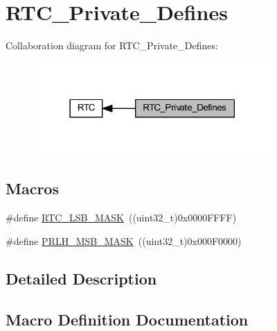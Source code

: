 \hypertarget{group___r_t_c___private___defines}{}\section{R\+T\+C\+\_\+\+Private\+\_\+\+Defines}
\label{group___r_t_c___private___defines}
Collaboration diagram for R\+T\+C\+\_\+\+Private\+\_\+\+Defines\+:
\nopagebreak
\begin{figure}[H]
\begin{center}
\leavevmode
\includegraphics[width=258pt]{group___r_t_c___private___defines}
\end{center}
\end{figure}
\subsection*{Macros}
\begin{DoxyCompactItemize}
\item 
\#define \hyperlink{group___r_t_c___private___defines_gae19d75bb0ecb5e93d97e026a04d4854f}{R\+T\+C\+\_\+\+L\+S\+B\+\_\+\+M\+A\+SK}~((uint32\+\_\+t)0x0000\+F\+F\+F\+F)
\item 
\#define \hyperlink{group___r_t_c___private___defines_ga47b3eed8e018a9139bc7bb374c7ca125}{P\+R\+L\+H\+\_\+\+M\+S\+B\+\_\+\+M\+A\+SK}~((uint32\+\_\+t)0x000\+F0000)
\end{DoxyCompactItemize}


\subsection{Detailed Description}


\subsection{Macro Definition Documentation}
\mbox{\label{group___r_t_c___private___defines_ga47b3eed8e018a9139bc7bb374c7ca125}} 
